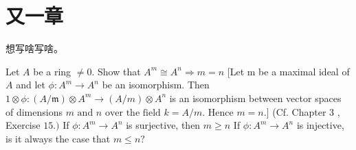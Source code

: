 \section{又一章}

想写啥写啥。


\begin{problem}
    Let $A$ be a ring $\neq 0 .$ Show that $A^{m} \cong A^{n} \Rightarrow m=n$ [Let m be a maximal ideal of $A$ and let $\phi: A^{m} \rightarrow A^{n}$ be an isomorphism. Then
$1 \otimes \phi:(A / \mathfrak{m}) \otimes A^{m} \rightarrow(A / m) \otimes A^{n}$ is an isomorphism between vector spaces
of dimensions $m \text { and } n \text { over the field } k=A / m . \text { Hence } m=n .]$ (Cf. Chapter 3 , Exercise $15 .)$
If $\phi: A^{m} \rightarrow A^{n}$ is surjective, then $m \geqslant n$
If $\phi: A^{m} \rightarrow A^{n}$ is injective, is it always the case that $m \leqslant n ?$
\end{problem}